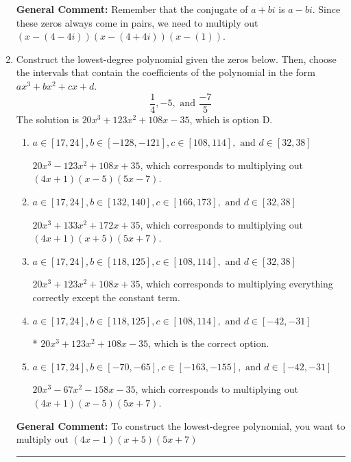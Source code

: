 \documentclass{extbook}[14pt]
\newcommand{\litem}[1]{\item #1

\rule{\textwidth}{0.4pt}}
\begin{document}
\begin{enumerate}
{\textbf{General Comment:} Remember that the conjugate of $a+bi$ is $a-bi$. Since these zeros always come in pairs, we need to multiply out $(x-(4 - 4 i))(x-(4 + 4 i))(x-(1))$.
}
\litem{
Construct the lowest-degree polynomial given the zeros below. Then, choose the intervals that contain the coefficients of the polynomial in the form $ax^3+bx^2+cx+d$.
\[ \frac{1}{4}, -5, \text{ and } \frac{-7}{5} \]The solution is \( 20x^{3} +123 x^{2} +108 x -35 \), which is option D.\begin{enumerate}[label=\Alph*.]
\item \( a \in [17, 24], b \in [-128, -121], c \in [108, 114], \text{ and } d \in [32, 38] \)

$20x^{3} -123 x^{2} +108 x + 35$, which corresponds to multiplying out $(4x + 1)(x -5)(5x -7)$.
\item \( a \in [17, 24], b \in [132, 140], c \in [166, 173], \text{ and } d \in [32, 38] \)

$20x^{3} +133 x^{2} +172 x + 35$, which corresponds to multiplying out $(4x + 1)(x + 5)(5x + 7)$.
\item \( a \in [17, 24], b \in [118, 125], c \in [108, 114], \text{ and } d \in [32, 38] \)

$20x^{3} +123 x^{2} +108 x + 35$, which corresponds to multiplying everything correctly except the constant term.
\item \( a \in [17, 24], b \in [118, 125], c \in [108, 114], \text{ and } d \in [-42, -31] \)

* $20x^{3} +123 x^{2} +108 x -35$, which is the correct option.
\item \( a \in [17, 24], b \in [-70, -65], c \in [-163, -155], \text{ and } d \in [-42, -31] \)

$20x^{3} -67 x^{2} -158 x -35$, which corresponds to multiplying out $(4x + 1)(x -5)(5x + 7)$.
\end{enumerate}

\textbf{General Comment:} To construct the lowest-degree polynomial, you want to multiply out $(4x -1)(x + 5)(5x + 7)$
}
\end{enumerate}
\end{document}
